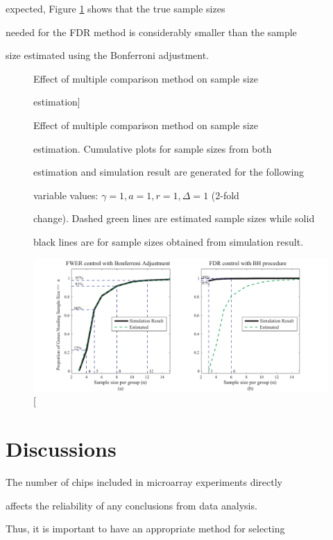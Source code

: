 \documentclass[12pt]{article}
\begin{document}
expected, Figure \ref{fig:ResMtd} shows that the true sample sizes

needed for the FDR method is considerably smaller than the sample

size estimated using the Bonferroni adjustment.



\begin{figure}%

  \caption[Effect of multiple comparison method on sample size

    estimation] {Effect of multiple comparison method on sample size

    estimation.  Cumulative plots for sample sizes from both

    estimation and simulation result are generated for the following

    variable values: $\gamma = 1, a = 1, r = 1, \Delta = 1$ (2-fold

    change). Dashed green lines are estimated sample sizes while solid

    black lines are for sample sizes obtained from simulation result.}

  \label{fig:ResMtd}

  \centerline{\includegraphics*[width=\textwidth]{ResMtd.pdf}}

\end{figure}



\section{Discussions}



The number of chips included in microarray experiments directly

affects the reliability of any conclusions from data analysis.

Thus, it is important to have an appropriate method for selecting
\end{document}
